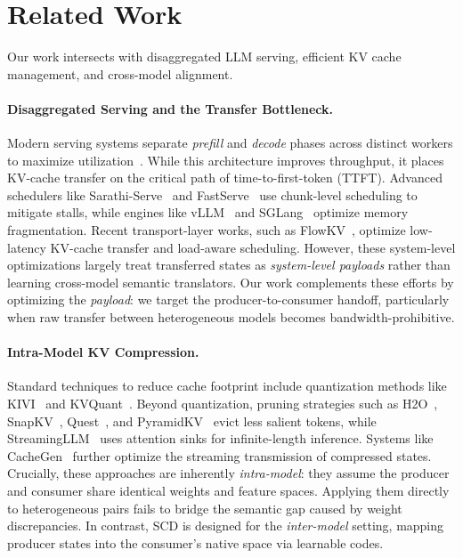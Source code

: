 \documentclass{article}
\theoremstyle{plain}
\theoremstyle{definition}
\theoremstyle{remark}
\begin{document}
\section{Related Work}
\label{sec:related}

Our work intersects with disaggregated LLM serving, efficient KV cache management, and cross-model alignment.

\paragraph{Disaggregated Serving and the Transfer Bottleneck.}
Modern serving systems separate \emph{prefill} and \emph{decode} phases across distinct workers to maximize utilization~\citep{zhong2024distserve,qin2024mooncake,patel2024splitwise}.
While this architecture improves throughput, it places KV-cache transfer on the critical path of time-to-first-token (TTFT).
Advanced schedulers like Sarathi-Serve~\citep{agrawal2024taming} and FastServe~\citep{wu2023fast} use chunk-level scheduling to mitigate stalls, while engines like vLLM~\citep{kwon2023vllm} and SGLang~\citep{zheng2024sglang} optimize memory fragmentation.
Recent transport-layer works, such as FlowKV~\citep{li2025flowkv}, optimize low-latency KV-cache transfer and load-aware scheduling.
However, these system-level optimizations largely treat transferred states as \emph{system-level payloads} rather than learning cross-model semantic translators.
Our work complements these efforts by optimizing the \emph{payload}: we target the producer-to-consumer handoff, particularly when raw transfer between heterogeneous models becomes bandwidth-prohibitive.

\paragraph{Intra-Model KV Compression.}
Standard techniques to reduce cache footprint include quantization methods like KIVI~\citep{liu2024kivi} and KVQuant~\citep{hooper2024kvquant}.
Beyond quantization, pruning strategies such as H2O~\citep{zhang2023h2o}, SnapKV~\citep{li2024snapkv}, Quest~\citep{tang2024quest}, and PyramidKV~\citep{cai2024pyramidkv} evict less salient tokens, while StreamingLLM~\citep{xiao2023efficient} uses attention sinks for infinite-length inference.
Systems like CacheGen~\citep{liu2024cachegen} further optimize the streaming transmission of compressed states.
Crucially, these approaches are inherently \emph{intra-model}: they assume the producer and consumer share identical weights and feature spaces.
Applying them directly to heterogeneous pairs fails to bridge the semantic gap caused by weight discrepancies.
In contrast, SCD is designed for the \emph{inter-model} setting, mapping producer states into the consumer's native space via learnable codes.
\end{document}

